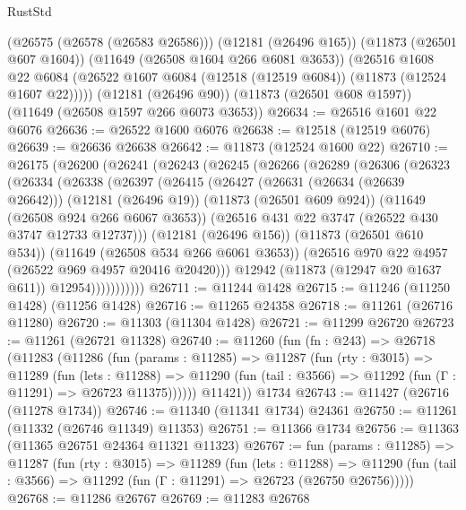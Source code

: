 \begin{lexlean}{RustStd}
\begin{coremodule}
      (@26575 (@26578 (@26583 @26586)))
      (@12181 (@26496 @165))
      (@11873 (@26501 @607 @1604))
      (@11649 (@26508 @1604 @266 @6081 @3653))
      (@26516
        @1608
        @22
        @6084
        (@26522 @1607 @6084 (@12518 (@12519 @6084)) (@11873 (@12524 @1607 @22)))))
    (@12181 (@26496 @90))
    (@11873 (@26501 @608 @1597))
    (@11649 (@26508 @1597 @266 @6073 @3653))
@26634 := @26516 @1601 @22 @6076
@26636 := @26522 @1600 @6076
@26638 := @12518 (@12519 @6076)
@26639 := @26636 @26638
@26642 := @11873 (@12524 @1600 @22)
@26710 := @26175
    (@26200
      (@26241
        (@26243
          (@26245
            (@26266
              (@26289
                (@26306
                  (@26323
                    (@26334
                      (@26338
                        (@26397
                          (@26415
                            (@26427
                              (@26631 (@26634 (@26639 @26642)))
                              (@12181 (@26496 @19))
                              (@11873 (@26501 @609 @924))
                              (@11649 (@26508 @924 @266 @6067 @3653))
                              (@26516 @431 @22 @3747 (@26522 @430 @3747 @12733 @12737)))
                            (@12181 (@26496 @156))
                            (@11873 (@26501 @610 @534))
                            (@11649 (@26508 @534 @266 @6061 @3653))
                            (@26516 @970 @22 @4957 (@26522 @969 @4957 @20416 @20420)))
                          @12942
                          (@11873 (@12947 @20 @1637 @611))
                          @12954)))))))))))
@26711 := @11244 @1428
@26715 := @11246 (@11250 @1428) (@11256 @1428)
@26716 := @11265 @24358
@26718 := @11261 (@26716 @11280)
@26720 := @11303 (@11304 @1428)
@26721 := @11299 @26720
@26723 := @11261 (@26721 @11328)
@26740 := @11260
    (fun (fn : @243) =>
    @26718
      (@11283
        (@11286
          (fun (params : @11285) =>
          @11287
            (fun (rty : @3015) =>
            @11289
              (fun (lets : @11288) =>
              @11290 (fun (tail : @3566) => @11292 (fun (Γ : @11291) => @26723 @11375))))))
        @11421))
    @1734
@26743 := @11427 (@26716 (@11278 @1734))
@26746 := @11340 (@11341 @1734) @24361
@26750 := @11261 (@11332 (@26746 @11349) @11353)
@26751 := @11366 @1734
@26756 := @11363 (@11365 @26751 @24364 @11321 @11323)
@26767 := fun (params : @11285) =>
  @11287
    (fun (rty : @3015) =>
    @11289
      (fun (lets : @11288) =>
      @11290 (fun (tail : @3566) => @11292 (fun (Γ : @11291) => @26723 (@26750 @26756)))))
@26768 := @11286 @26767
@26769 := @11283 @26768

\end{coremodule}
\end{lexlean}
